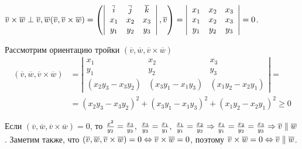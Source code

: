 \begin{MyList}
		  \item $\overline{v} \times \overline{w} \perp \overline{v}, \overline{w}\\
		  (\overline{v}, \overline{v} \times \overline{w}) = 
			\left(\left|\begin{array}{cccc}
			  \overline{i} & \overline{j} & \overline{k} \\ 
			  x_1 & x_2 & x_3 \\ 
			  y_1 & y_2 & y_3
			  \end{array}\right|, \overline{v}\right) = 
			  \left|\begin{array}{cccc}
				  x_1 &  x_2 & x_3 \\ 
				  x_1 &  x_2 & x_3 \\ 
				  y_1 & y_2 & y_3
				  \end{array}\right| = 0$.
		  \item Рассмотрим ориентацию тройки $(\overline{v}, \overline{w}, \overline{v} \times \overline{w})$
		  \begin{align*}
			(\overline{v}, \overline{w}, \overline{v} \times \overline{w}) &=
		  \left|\begin{array}{cccc}
			  x_1 & x_2 & x_3 \\ 
			  y_1 & y_2 & y_3 \\ 
			  (x_2 y_3 - x_3 y_2) & (x_3 y_1 - x_1 y_3) & (x_1 y_2 - x_2 y_1)
			  \end{array}\right| = \\
			  &= (x_2 y_3 - x_3 y_2)^2 + (x_3 y_1 - x_1 y_3)^2 + (x_1 y_2 - x_2 y_1)^2 \geqslant 0
		  \end{align*}

		  Если $(\overline{v}, \overline{w}, \overline{v} \times \overline{w}) = 0$, то $\frac{x^2}{y_2} = \frac{x_3}{y_3}, \ \frac{x_3}{y_3} = \frac{x_1}{y_1}, \ \frac{x_1}{y_1} = \frac{x_2}{y_2} \SO \frac{x_1}{y_1} = \frac{x_2}{y_2} = \frac{x_3}{y_3} \SO \overline{v} \parallel \overline{w}$.
		  Заметим также, что $(\overline{v}, \overline{w}, \overline{v} \times \overline{w}) = 0 \Leftrightarrow \overline{v} \times \overline{w} = 0$, поэтому $\overline{v} \times \overline{w} = 0 \Leftrightarrow \overline{v} \parallel \overline{w}$.
		  

\end{MyList}

